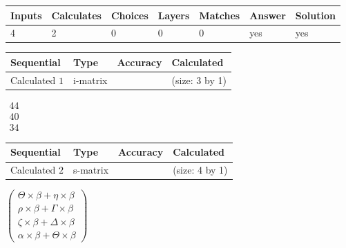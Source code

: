 \documentclass[12pt]{article}
\begin{document}
 

 
 
\noindent{}
 
 

 
\vspace{0.3in}
   
   
   
   
\noindent\begin{tabular}{|l|l|l|l|l|l|l|}
 \hline
Inputs & Calculates & Choices & Layers & Matches & Answer & Solution \\ \hline
           4 & 
           2 & 
           0
  & 
           0 & 
           0 & 
  yes & 
  yes 
  \\ \hline
 \end{tabular}
   
   
   
   
\noindent{}
   
   
  
  
\noindent\begin{tabular}{|l|l|l|l|}
\hline
 Sequential & Type & Accuracy & Calculated \\ 
\hline
 
 
  Calculated $           1$ & i-matrix &  & 
 (size:           3 by           1)
 \\  \hline  
 \end{tabular}
   
   
$\begin{array}{
 c
 }
          44 \\ 
          40 \\ 
          34
 \end{array}  $ 
  
  
\noindent\begin{tabular}{|l|l|l|l|}
\hline
 Sequential & Type & Accuracy & Calculated \\ 
\hline
 
 
  Calculated $           2$ & s-matrix & & 
 (size:           4 by           1)
 \\  \hline  
 \end{tabular}
   
   
 $   \left( \begin{array}
 {
 c
 }
 \Theta \times  \beta   +  \eta \times  \beta \\ 
 \rho \times  \beta   +  \Gamma \times  \beta \\ 
                    \zeta \times  \beta   +  \Delta \times  \beta \\ 
 \alpha \times  \beta   +  \Theta \times  \beta
 \end{array} \right) $ 
   
\end{document}
